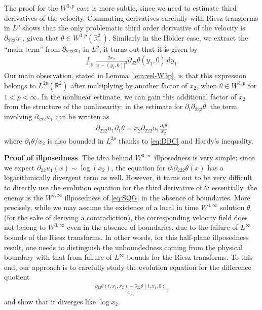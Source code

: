 \documentclass[10pt]{amsart}
\theoremstyle{definition}
\theoremstyle{remark}
\numberwithin{equation}{section}
\newcommand{\ud}{\mathrm{d}}
\newcommand{\rd}{\partial}
\newcommand{\0}{\emptyset}
\newcommand{\tht}{\theta}
\newcommand{\bbR}{\mathbb R}
\begin{document}
	The proof for the $W^{3,p}$ case is more subtle, since we need to estimate third derivatives of the velocity. Commuting derivatives carefully with Riesz transforms in $L^{p}$ shows that the only problematic third order derivative of the velocity is $\rd_{222}u_{1}$, given that $\tht \in W^{3,p}(\bbR^3_+)$. Similarly in the H\"older case, we extract the ``main term'' from $\rd_{222}u_{1}$ in $L^{p}$; it turns out that it is given by \begin{equation*}
		\begin{split}
			\int_{\bbR} \frac{2x_{2}}{|x-(y_1,0)|^{3}} \rd_{22}\tht (y_1,0) \, \ud y_{1}. 
		\end{split}
	\end{equation*} Our main observation, stated in Lemma \ref{lem:vel-W3p}, is that this expression belongs to $L^{2p}(\bbR^2)$ after multiplying by another factor of $x_{2}$, when $\tht \in W^{3,p}$ for $1<p<\infty$. In the nonlinear estimate, we can gain this additional factor of $x_{2}$ from the structure of the nonlinearity: in the estimate for $\rd_{t}\rd_{222}\tht$, the term involving $\rd_{222}u_{1}$ can be written as \begin{equation*}
	\begin{split}
		\rd_{222}u_{1} \rd_{1}\tht = x_{2}\rd_{222}u_{1} \frac{\rd_{1}\tht}{x_{2}} 
	\end{split}
	\end{equation*} where $\rd_{1}\tht/x_{2}$ is also bounded in $L^{2p}$ thanks to \eqref{eq:DBC} and Hardy's inequality. 
	
	\medskip 
	
	\noindent \textbf{Proof of illposedness}. The idea behind $W^{3,\infty}$ illposedness is very simple: since we expect $\rd_{22}u_{1}(x) \sim \log(x_{2})$, the equation for  $\rd_{t}\rd_{222}\tht(x)$ has a logarithmically divergent term as well. However, it turns out to be very difficult to directly use the evolution equation for the third derivative of $\tht$: essentially, the enemy is the $W^{3,\infty}$ illposedness of \eqref{eq:SQG} in the absence of boundaries. More precisely, while we may assume the existence of a local in time $W^{3,\infty}$ solution $\tht$ (for the sake of deriving a contradiction), the corresponding velocity field does not belong to $W^{3,\infty}$ even in the absence of boundaries, due to the failure of $L^{\infty}$ bounds of the Riesz transforms. In other words, for this half-plane illposedness result, one needs to distinguish the unboundedness coming from the physical boundary with that from failure of $L^{\infty}$ bounds for the Riesz transforms. To this end, our approach is to carefully study the evolution equation for the difference quotient \begin{equation*}
		\begin{split}
			\frac{ \rd_{22}\tht(t,x_1,x_2) - \rd_{22}\tht(t,x_1,0) }{x_{2}}, 
		\end{split}
	\end{equation*} and show that it diverges like $\log x_2$. 
	
\end{document}
